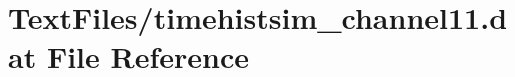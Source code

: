 \hypertarget{TextFiles_2timehistsim__channel11_8dat}{}\section{Text\+Files/timehistsim\+\_\+channel11.dat File Reference}
\label{TextFiles_2timehistsim__channel11_8dat}
